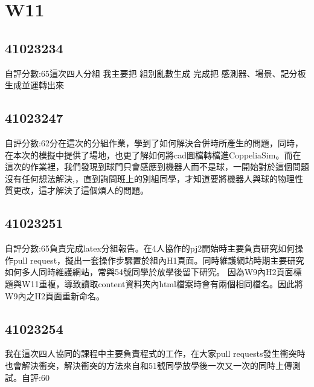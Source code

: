 \chapter{W11}


\section{41023234}
自評分數:65這次四人分組 我主要把  組別亂數生成  完成把  感測器、場景、記分板  生成並運轉出來


\section{41023247}
自評分數:62分在這次的分組作業，學到了如何解決合併時所產生的問題，同時，在本次的模擬中提供了場地，也更了解如何將cad圖檔轉檔進CoppeliaSim。而在這次的作業裡，我們發現到球門只會感應到機器人而不是球，一開始對於這個問題沒有任何想法解決,，直到詢問班上的別組同學，才知道要將機器人與球的物理性質更改，這才解決了這個煩人的問題。

\section{41023251}
自評分數:65負責完成latex分組報告。在4人協作的pj2開始時主要負責研究如何操作pull request，擬出一套操作步驟置於組內H1頁面。同時維護網站時期主要研究如何多人同時維護網站，常與54號同學於放學後留下研究。
因為W9內H2頁面標題與W11重複，導致讀取content資料夾內html檔案時會有兩個相同檔名。因此將W9內之H2頁面重新命名。

\section{41023254}
我在這次四人協同的課程中主要負責程式的工作，在大家pull requests發生衝突時也會解決衝突，解決衝突的方法來自和51號同學放學後一次又一次的同時上傳測試。自評:60